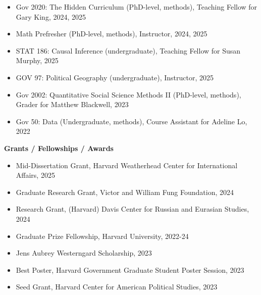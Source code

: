 \documentclass[12pt]{article}
\begin{document}
\begin{footnotesize}
\begin{itemize}[noitemsep,nolistsep]
\item Gov 2020: The Hidden Curriculum (PhD-level, methods), Teaching Fellow for Gary King, 2024, 2025

\item Math Prefresher (PhD-level, methods), Instructor, 2024, 2025

\item STAT 186: Causal Inference (undergraduate), Teaching Fellow for Susan Murphy, 2025

\item GOV 97: Political Geography (undergraduate), Instructor, 2025

\item Gov 2002: Quantitative Social Science Methods II (PhD-level, methods), Grader for Matthew Blackwell, 2023

\item Gov 50: Data (Undergraduate, methods), Course Assistant for Adeline Lo, 2022

\end{itemize}

\vspace{5mm} 





{\bf {\normalsize Grants / Fellowships / Awards}}

\vspace{3mm} 

\vspace{1mm} 

\begin{itemize}[noitemsep,nolistsep]

\item Mid-Dissertation Grant, Harvard Weatherhead Center for International Affairs, 2025

\item Graduate Research Grant, Victor and William Fung Foundation, 2024

\item Research Grant, (Harvard) Davis Center for Russian and Eurasian Studies, 2024

\item Graduate Prize Fellowship, Harvard University, 2022-24

\item Jens Aubrey Westerngard Scholarship, 2023

\item Best Poster, Harvard Government Graduate Student Poster Session, 2023

\item Seed Grant, Harvard Center for American Political Studies, 2023


\end{itemize}
\end{footnotesize}
\end{document}
